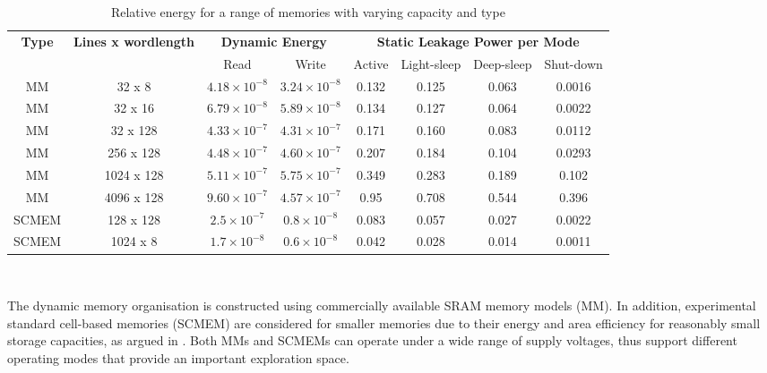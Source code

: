 \documentclass{acm_proc_article-sp}
\begin{document}
\begin{center}
	\begin{table*}[!t]
	\caption{Relative energy for a range of memories with varying capacity and type}
	\label{tab:relative}
	{\small
	\hfill{}
	\begin{tabular}{|c|c|c|c|c|c|c|c|}
		\hline
		\multirow{2}{*}{\textbf{Type}} & \multirow{2}{*}{\textbf{Lines x wordlength}} & \multicolumn{2}{c|}{\textbf{Dynamic Energy}}& \multicolumn{4}{c|}{\textbf{Static Leakage Power per Mode}}\\ \cline{3-8}
		& & Read & Write & Active & Light-sleep & Deep-sleep & Shut-down \\ 
		\hline 
		MM & 32 x 8 &  $ 4.18 \times 10^{-8} $ &  $ 3.24 \times 10^{-8} $ & 0.132 & 0.125 & 0.063 & 0.0016\\ 
		\hline
		MM & 32 x 16 & $  6.79 \times 10^{-8} $ &  $ 5.89 \times 10^{-8} $ & 0.134 & 0.127 & 0.064 & 0.0022\\ 
		\hline
		MM & 32 x 128 & $  4.33 \times 10^{-7} $ &  $ 4.31 \times 10^{-7} $ & 0.171 & 0.160 & 0.083 & 0.0112\\ 
		\hline
		MM & 256 x 128 & $  4.48 \times 10^{-7} $ &  $ 4.60 \times 10^{-7} $ & 0.207 & 0.184 & 0.104 & 0.0293\\ 
		\hline
		MM & 1024 x 128 & $  5.11 \times 10^{-7} $ &  $ 5.75 \times 10^{-7} $ & 0.349 & 0.283 & 0.189 & 0.102\\ 
		\hline
		MM & 4096 x 128 & $  9.60 \times 10^{-7} $ &  $ 4.57 \times 10^{-7} $ & 0.95 & 0.708 & 0.544 & 0.396\\ 
		\hline
		SCMEM & 128 x 128 & $  2.5 \times 10^{-7} $ &  $ 0.8 \times 10^{-8} $ & 0.083 & 0.057 & 0.027 & 0.0022\\ 
		\hline
		SCMEM & 1024 x 8 & $  1.7 \times 10^{-8} $ &  $ 0.6 \times 10^{-8} $ & 0.042 & 0.028 & 0.014 & 0.0011\\ 
		\hline
	\end{tabular}}
	\hfill{}
	\\
	\end{table*}
\end{center}

The dynamic memory organisation is constructed using commercially available SRAM memory models (MM). In addition, experimental standard cell-based memories (SCMEM) \cite{Mei11}  are  considered for smaller memories due to their energy and area efficiency for reasonably small storage capacities, as argued in \cite{Mei10}. Both MMs and SCMEMs can operate under a wide range of supply voltages, thus support different operating modes that provide an important exploration space.
\end{document}
